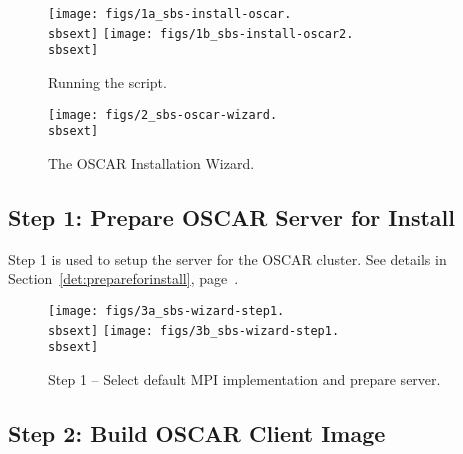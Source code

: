 \begin{figure}[h!]
  \begin{center}
    \centerline{
      \texttt{[image: figs/1a\_sbs-install-oscar.\\sbsext]}
      \hspace{\imghskip}
      \texttt{[image: figs/1b\_sbs-install-oscar2.\\sbsext]}
      }
    \caption{Running the  script.}
    \label{fig:sbs-install-oscar}
  \end{center}
\end{figure}

\begin{figure}[ht!]
  \begin{center}
    \centerline{\texttt{[image: figs/2\_sbs-oscar-wizard.\\sbsext]}}
    \caption{The OSCAR Installation Wizard.}
    \label{fig:sbs-install-wizard}
  \end{center}
\end{figure}



\subsection{Step 1: Prepare OSCAR Server for Install}

Step 1 is used to setup the server for the OSCAR cluster.  See details
in Section~\ref{det:prepareforinstall},
page~\pageref{det:prepareforinstall}. 

\begin{figure}[hb!]
  \begin{center}
    \centerline{
      \texttt{[image: figs/3a\_sbs-wizard-step1.\\sbsext]}
      \hspace{\imghskip}
      \texttt{[image: figs/3b\_sbs-wizard-step1.\\sbsext]}
      }
    \caption{Step 1 -- Select default MPI implementation and prepare server.}
    \label{fig:sbs-install-wizard-s1}
  \end{center}
\end{figure}



\subsection{Step 2: Build OSCAR Client Image}

